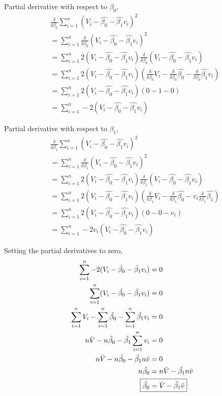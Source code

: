 \documentclass{article}
\begin{document}
Partial derivative with respect to $\beta_0$,
\begin{align*} 
& \frac{\delta}{\delta \beta_0}  \sum_{i=1}^{n}(V_i - \hat{\beta_0} - \hat{\beta_1}v_i)^2 \\ 
&= \sum_{i=1}^{n} \frac{\delta}{\delta \beta_0} (V_i - \hat{\beta_0} - \hat{\beta_1}v_i)^2 \\
&= \sum_{i=1}^{n} 2 (V_i - \hat{\beta_0} - \hat{\beta_1}v_i) \frac{\delta}{\delta \beta_0} (V_i - \hat{\beta_0} - \hat{\beta_1}v_i) \\ 
&= \sum_{i=1}^{n} 2 (V_i - \hat{\beta_0} - \hat{\beta_1}v_i) (\frac{\delta}{\delta \beta_0} V_i - \frac{\delta}{\delta \beta_0} \hat{\beta_0} - \frac{\delta}{\delta \beta_0}\hat{\beta_1}v_i) \\
&= \sum_{i=1}^{n} 2 (V_i - \hat{\beta_0} - \hat{\beta_1}v_i) (0 - 1 - 0) \\
&= \sum_{i=1}^{n} -2 (V_i - \hat{\beta_0} - \hat{\beta_1}v_i)
\end{align*} 

Partial derivative with respect to $\beta_1$,
\begin{align*} 
& \frac{\delta}{\delta \beta_1}  \sum_{i=1}^{n}(V_i - \hat{\beta_0} - \hat{\beta_1}v_i)^2 \\ 
&= \sum_{i=1}^{n} \frac{\delta}{\delta \beta_1} (V_i - \hat{\beta_0} - \hat{\beta_1}v_i)^2 \\
&= \sum_{i=1}^{n} 2(V_i - \hat{\beta_0} - \hat{\beta_1}v_i)\frac{\delta}{\delta \beta_1} (V_i - \hat{\beta_0} - \hat{\beta_1}v_i) \\
&= \sum_{i=1}^{n} 2(V_i - \hat{\beta_0} - \hat{\beta_1}v_i)(\frac{\delta}{\delta \beta_1} V_i - \frac{\delta}{\delta \beta_1}\hat{\beta_0} - v_i \frac{\delta}{\delta \beta_1}\hat{\beta_1}) \\
&= \sum_{i=1}^{n} 2(V_i - \hat{\beta_0} - \hat{\beta_1}v_i)(0 - 0 - v_i) \\
&= \sum_{i=1}^{n} -2v_i(V_i - \hat{\beta_0} - \hat{\beta_1}v_i)
\end{align*} 

Setting the partial derivatives to zero,
\begin{align*} 
\sum_{i=1}^{n} -2 (V_i - \hat{\beta_0} - \hat{\beta_1}v_i) &= 0   \\
\sum_{i=1}^{n} (V_i - \hat{\beta_0} - \hat{\beta_1}v_i) &= 0   \\
\sum_{i=1}^{n} V_i - \sum_{i=1}^{n}\hat{\beta_0} - \sum_{i=1}^{n}\hat{\beta_1}v_i &= 0   \\
n \bar{V} - n\hat{\beta_0} - \hat{\beta_1}\sum_{i=1}^{n}v_i &= 0   \\
n \bar{V} - n\hat{\beta_0} - \hat{\beta_1}n\bar{v} &= 0   \\
n\hat{\beta_0} &= n \bar{V} - \hat{\beta_1}n\bar{v} \\
\Aboxed{\hat{\beta_0} &=  \bar{V} - \hat{\beta_1}\bar{v}} 
\end{align*} 
\end{document}
